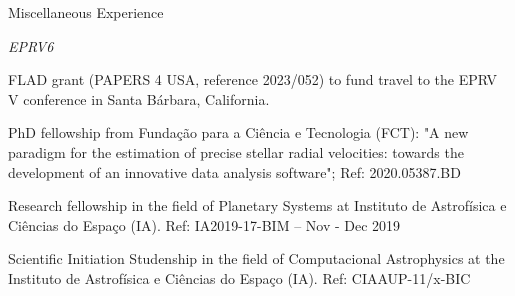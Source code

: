 
\begin{rubric}{Miscellaneous Experience}



\entry*[2024]  \textit{EPRV6} 

\entry*[2019]  



\entry*[\dates{2023/02}]
	FLAD grant (PAPERS 4 USA, reference 2023/052) to fund travel to the EPRV V conference in Santa Bárbara, California.

	PhD fellowship from Fundação para a Ciência e Tecnologia (FCT): "A new paradigm for the estimation of precise stellar radial velocities: towards the development of an innovative data analysis software"; Ref: 2020.05387.BD

\entry*[\dates{2019-11/2019-12}]
	Research fellowship in the field of Planetary Systems at Instituto de Astrofísica e Ciências do Espaço (IA).  Ref: IA2019-17-BIM -- Nov - Dec 2019 

\entry*[\dates{2019-04/2019-09}]
	Scientific Initiation Studenship  in the field of Computacional Astrophysics at the Instituto de Astrofísica e Ciências do Espaço (IA).  Ref: CIAAUP-11/x-BIC 


\end{rubric}